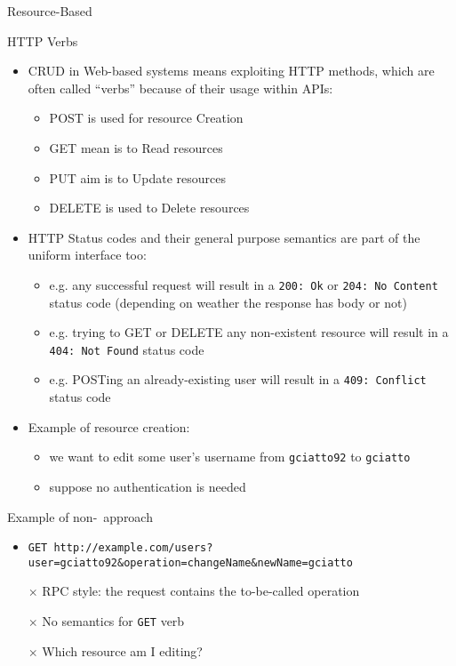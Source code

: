 \begin{frame}
\begin{block}{Resource-Based}
\begin{itemize}
		\end{itemize}
	\end{block}
		
	\begin{block}{HTTP Verbs}
	
		\begin{itemize}
			\item CRUD in Web-based systems means exploiting HTTP methods, which are often called ``verbs'' because of their usage within APIs:
			\begin{itemize}
				\item POST is used for resource Creation
				\item GET mean is to Read resources
				\item PUT aim is to Update resources
				\item DELETE is used to Delete resources					
			\end{itemize}
			\item HTTP Status codes and their general purpose semantics are part of the uniform interface too:
			\begin{itemize}
				\item e.g. any successful request will result in a \texttt{200:\,Ok} or \texttt{204:\,No\,Content} status code (depending on weather the response has body or not)
				\item e.g. trying to GET or DELETE any non-existent resource will result in a \texttt{404:\,Not\,Found} status code
				\item e.g. POSTing an already-existing user will result in a \texttt{409:\,Conflict} status code
			\end{itemize}
		\end{itemize}
	\end{block}
	
	\framebreak
	
	\begin{itemize}
		\item Example of resource creation: 
		\begin{itemize}
			\item we want to edit some user's username from \texttt{gciatto92} to \texttt{gciatto}
			\item suppose no authentication is needed
		\end{itemize}
	\end{itemize}
	
	\begin{alertblock}{Example of non-\restful\ approach}
		\begin{itemize}
			\item \texttt{GET http://example.com/users?\-user=gciatto92\&\-operation=changeName\&\-newName=gciatto}
			\item[]
			\item[$\times$] RPC style: the request contains the to-be-called operation
			\item[$\times$] No semantics for \texttt{GET} verb
			\item[$\times$] Which resource am I editing?
		\end{itemize}
	\end{alertblock}	
	

\end{frame}
